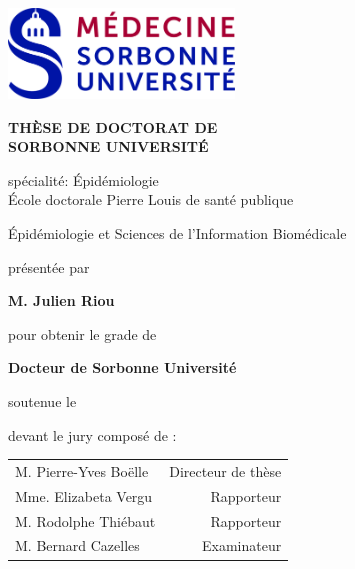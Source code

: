 \documentclass[a4paper,12pt]{book}
\numberwithin{equation}{chapter}
\numberwithin{figure}{chapter}
\numberwithin{table}{chapter}
\begin{document}
\frontmatter %
\thispagestyle{empty}

\begin{center}

\includegraphics[width=6cm]{Figures/LOGO_MEDECINE.jpg}
\vspace*{1.5cm}

{\large{\bf  TH\`ESE DE DOCTORAT DE \\[.5em] SORBONNE UNIVERSITÉ }}

\vspace*{1cm}
{\large spécialité:  Épidémiologie} \\ 


\vspace*{1cm}
{\large École doctorale \guillemotleft Pierre Louis\guillemotright \; de santé publique}

\vspace*{.2cm}
Épidémiologie et Sciences de l'Information Biomédicale

\vspace*{1cm}
{\large présentée par}

\vspace*{0.2cm}
{\large {\bf M. Julien Riou}}

\vspace*{1cm}
{\large pour obtenir le grade de}

\vspace*{0.2cm}
{\large{\bf Docteur de Sorbonne Université}} \\

\vspace*{1.5cm}
\doublespacing
{}
\singlespacing

\end{center}

\vspace*{1.5cm} 
{\large soutenue le }

\vspace*{1cm} 
{\large devant le jury composé de : }

\begin{center}
{\large 
\begin{tabular}{p{10cm} r}
  M. Pierre-Yves Boëlle & Directeur de thèse\\
  Mme. Elizabeta Vergu & Rapporteur \\
  M. Rodolphe Thiébaut & Rapporteur  \\
  M. Bernard Cazelles & Examinateur  \\
\end{tabular}
}
\end{center}
\end{document}
